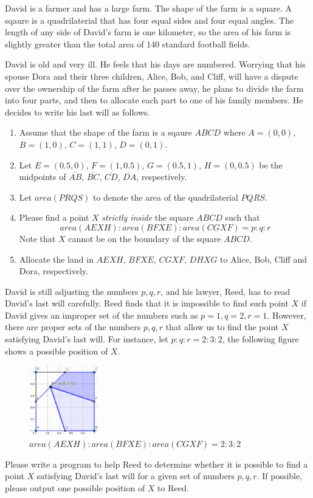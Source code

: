 David is a farmer and has a large farm. The shape of the farm is a square.
A sqaure is a quadrilaterial that has four equal sides and four equal angles.
The length of any side of David's farm is one kilometer, so the area of his farm
is slightly greater than the total area of 140 standard football fields.

David is old and very ill. He feels that his days are numbered.
Worrying that his spouse Dora and their three children, Alice, Bob, and Cliff, 
will have a dispute over the ownership
of the farm after he passes away,
he plans to divide the farm into four parts, 
and then to allocate each part to one of his family members.
He decides to write his last will as follows.
\begin{enumerate}
\tightlist
\item Assume that the shape of the farm is a sqaure $ABCD$ where $A=(0,0)$, $B=(1,0)$, 
$C=(1,1)$, $D=(0,1)$. 
\item Let $E=(0.5,0)$, $F=(1,0.5)$, $G=(0.5,1)$, $H=(0,0.5)$ be the midpoints of 
$\overline{AB}$, $\overline{BC}$, $\overline{CD}$, $\overline{DA}$, respectively.
\item Let $area(PRQS)$ to denote the area of the quadrilaterial $PQRS$.
\item Please find a point $X$ \emph{strictly inside} the square $ABCD$ such 
that  $$area(AEXH):area(BFXE):area(CGXF) = p:q:r$$
Note that $X$ cannot be on the boundary of the square $ABCD$.
\item Allocate the land in $AEXH$, $BFXE$, $CGXF$, $DHXG$ to Alice, Bob, Cliff and Dora,
respectively.
\end{enumerate}

David is still adjusting the numbers $p,q,r$, and his lawyer, Reed, has to read David's
last will carefully. Reed finds that it is impossible to find such point $X$ if 
David gives an improper set of the numbers such as $p=1, q=2, r=1$. 
However, there are proper sets of the numbers $p,q,r$ that allow us to find the point $X$
satisfying David's last will.
For instance, let $p:q:r = 2:3:2$, the following figure shows a possible position of $X$.

\begin{figure}[h]
\center
\includegraphics[width=0.27\textwidth]{image/farm.png}
\caption{$area(AEXH):area(BFXE):area(CGXF) = 2:3:2$}
\end{figure}

Please write a program to help Reed to determine whether it is possible to find
a point $X$ satisfying David's last will for a given set of numbers $p,q,r$.
If possible, please output one possible position of $X$ to Reed.

